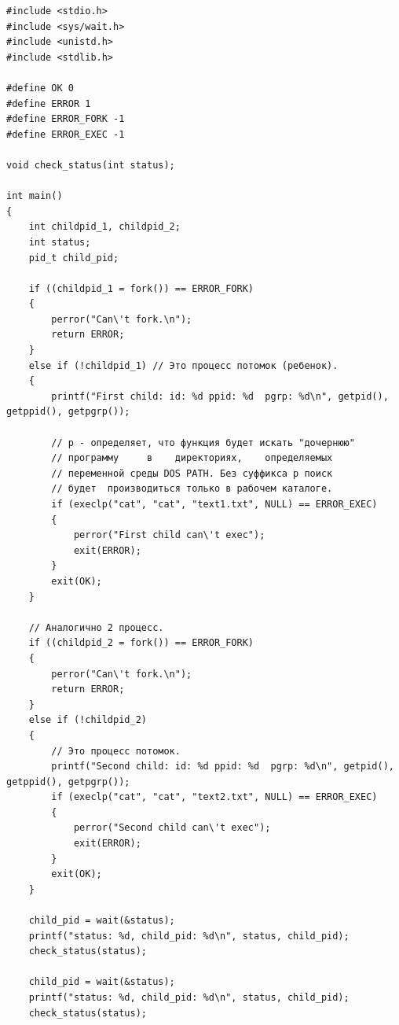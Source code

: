 \begin{figure}[ht!]
\end{figure}


\begin{lstlisting}[label=some-code,caption=Программа 3.]
#include <stdio.h>
#include <sys/wait.h>
#include <unistd.h>
#include <stdlib.h>

#define OK 0
#define ERROR 1
#define ERROR_FORK -1
#define ERROR_EXEC -1

void check_status(int status);

int main()
{
	int childpid_1, childpid_2;
	int status;
	pid_t child_pid;

	if ((childpid_1 = fork()) == ERROR_FORK)
	{
		perror("Can\'t fork.\n");
		return ERROR;
	}
	else if (!childpid_1) // Это процесс потомок (ребенок).
	{
		printf("First child: id: %d ppid: %d  pgrp: %d\n", getpid(), getppid(), getpgrp());

		// p - определяет, что функция будет искать "дочернюю"
		// программу     в    директориях,    определяемых
		// переменной среды DOS PATH. Без суффикса p поиск
		// будет  производиться только в рабочем каталоге.
		if (execlp("cat", "cat", "text1.txt", NULL) == ERROR_EXEC)
		{
			perror("First child can\'t exec");
			exit(ERROR);
		}
		exit(OK);
	}

	// Аналогично 2 процесс.
	if ((childpid_2 = fork()) == ERROR_FORK)
	{
		perror("Can\'t fork.\n");
		return ERROR;
	}
	else if (!childpid_2)
	{
		// Это процесс потомок.
		printf("Second child: id: %d ppid: %d  pgrp: %d\n", getpid(), getppid(), getpgrp());
		if (execlp("cat", "cat", "text2.txt", NULL) == ERROR_EXEC)
		{
			perror("Second child can\'t exec");
			exit(ERROR);
		}
		exit(OK);
	}

	child_pid = wait(&status);
	printf("status: %d, child_pid: %d\n", status, child_pid);
	check_status(status);

	child_pid = wait(&status);
	printf("status: %d, child_pid: %d\n", status, child_pid);
	check_status(status);


\end{lstlisting}

